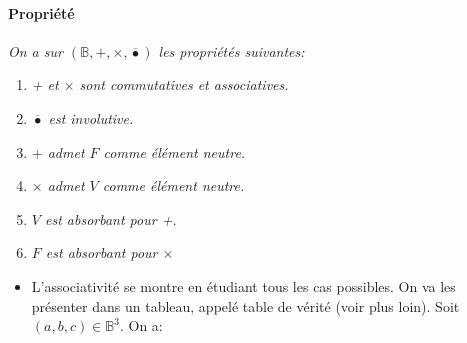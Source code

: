 \documentclass{scrartcl}
\newenvironment{demo}{\begin{itemize}[label=$\triangleright$]\item }{\end{itemize}}
\begin{document}
			\paragraph{Propriété} \textsl{On a sur $(\mathbb{B},+,\times,\overline{\bullet})$ les propriétés suivantes:}
				\begin{enumerate}
				\item \textsl{+ et $\times$ sont commutatives et associatives.}
				\item \textsl{$\overline{\bullet}$ est involutive.}
				\item \textsl{$+$ admet $F$ comme élément neutre.}
				\item \textsl{$\times$ admet $V$ comme élément neutre.}
				\item \textsl{$V$ est absorbant pour +.}
				\item \textsl{$F$ est absorbant pour $\times$}
				\end{enumerate}
			\begin{demo}
				L'associativité se montre en étudiant tous les cas possibles. 
				On va les présenter dans un tableau, appelé table de vérité (voir plus loin). 
				Soit $(a,b,c) \in \mathbb{B}^3$. On a:
			\end{demo}
\end{document}
